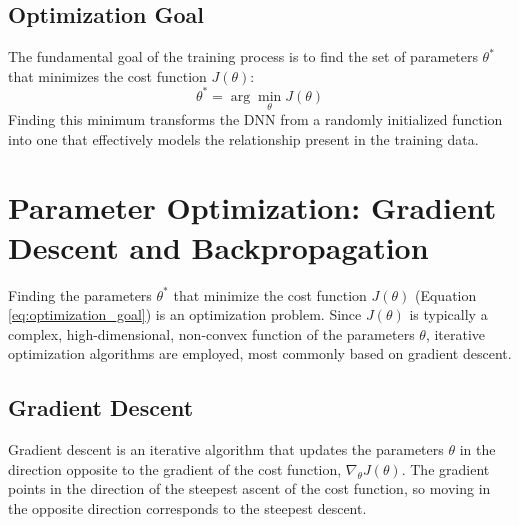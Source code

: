 \documentclass[11pt,twoside,openright]{report}
\begin{document}
\subsection{Optimization Goal}
The fundamental goal of the training process is to find the set of parameters $\theta^*$ that minimizes the cost function $J(\theta)$:
\begin{equation} \label{eq:optimization_goal}
    \theta^* = \arg \min_{\theta} J(\theta)
\end{equation}
Finding this minimum transforms the DNN from a randomly initialized function into one that effectively models the relationship present in the training data.


\newpage

\section{Parameter Optimization: Gradient Descent and Backpropagation}

Finding the parameters $\theta^*$ that minimize the cost function $J(\theta)$ (Equation \ref{eq:optimization_goal}) is an optimization problem. Since $J(\theta)$ is typically a complex, high-dimensional, non-convex function of the parameters $\theta$, iterative optimization algorithms are employed, most commonly based on gradient descent.

\subsection{Gradient Descent}
Gradient descent is an iterative algorithm that updates the parameters $\theta$ in the direction opposite to the gradient of the cost function, $\nabla_\theta J(\theta)$. The gradient points in the direction of the steepest ascent of the cost function, so moving in the opposite direction corresponds to the steepest descent.
\end{document}
